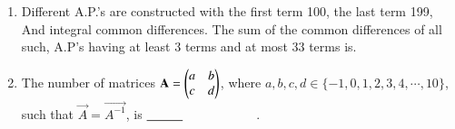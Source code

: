 \documentclass[journal,12pt,onecolumn]{IEEEtran}
\theoremstyle{remark}
\begin{document}
\begin{enumerate}
        \item Different A.P.'s are constructed with the first term 100, the last term 199, And integral common differences. The sum of the common differences of all such, A.P's having at least 3 terms and at most 33 terms is.
        \item The number of matrices $\mathbf{A}=\begin{pmatrix}a&b\\c&d\end{pmatrix}$, where $a,b,c,d \in\{-1,0,1,2,3,4,\cdots,10\}$, such that $\vec{A}=\vec{A^{-1}}$, is $\makebox[3cm][l]{\underline{\hspace{1cm}}}$.
    \end{enumerate}
\end{document}
